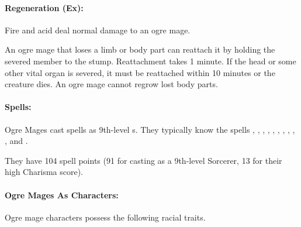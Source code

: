 \paragraph{Regeneration (Ex):}
Fire and acid deal normal damage to an ogre mage.

An ogre mage that loses a limb or body part can reattach it by holding the severed member to the stump. Reattachment takes 1 minute. If the head or some other vital organ is severed, it must be reattached within 10 minutes or the creature dies. An ogre mage cannot regrow lost body parts.
\paragraph{Spells:} Ogre Mages cast spells as 9th-level s.
They typically know the spells , , , , , , , , , , and .

They have 104 spell points (91 for casting as a 9th-level Sorcerer, 13 for their high Charisma score).
\paragraph{Ogre Mages As Characters:}
Ogre mage characters possess the following racial traits.

